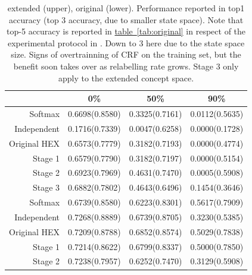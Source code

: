 \documentclass[11pt,a4paper]{article}
\begin{document}
\begin{table}[htbp]
\centering
\begin{tabular}{r|c|c|c}
 & 0\% & 50\% & 90\%\\
\hline
Softmax & 0.6698(0.8580) & 0.3325(0.7161) & 0.0112(0.5635)\\
Independent & 0.1716(0.7339) & 0.0047(0.6258) & 0.0000(0.1728)\\
Original HEX & 0.6573(0.7779) & 0.3182(0.7193) & 0.0000(0.4774)\\
Stage 1 & 0.6579(0.7790) & 0.3182(0.7197) & 0.0000(0.5154)\\
Stage 2 & 0.6923(0.7969) & 0.4631(0.7470) & 0.0005(0.5908)\\
Stage 3 & 0.6882(0.7802) & 0.4643(0.6496) & 0.1454(0.3646)\\
\hline
Softmax & 0.6739(0.8580) & 0.6223(0.8301) & 0.5617(0.7909)\\
Independent & 0.7268(0.8889) & 0.6739(0.8705) & 0.3230(0.5385)\\
Original HEX & 0.7209(0.8788) & 0.6852(0.8574) & 0.5029(0.7838)\\
Stage 1 & 0.7214(0.8622) & 0.6799(0.8337) & 0.5000(0.7850)\\
Stage 2 & 0.7238(0.7957) & 0.6252(0.7470) & 0.3129(0.5908)
\end{tabular}
\caption{extended (upper), original (lower). Performance reported in top1 accuracy (top 3 accuracy, due to smaller state space). Note that top-5 accuracy is reported in \hyperref[tab:original]{table~\ref{tab:original}} in respect of the experimental protocol in \cite{deng2014large}. Down to 3 here due to the state space size. Signs of overtrainning of CRF on the training set, but the benefit soon takes over as relabelling rate grows. Stage 3 only apply to the extended concept space.}
\label{tab:cnnacc}
\end{table}
\end{document}
